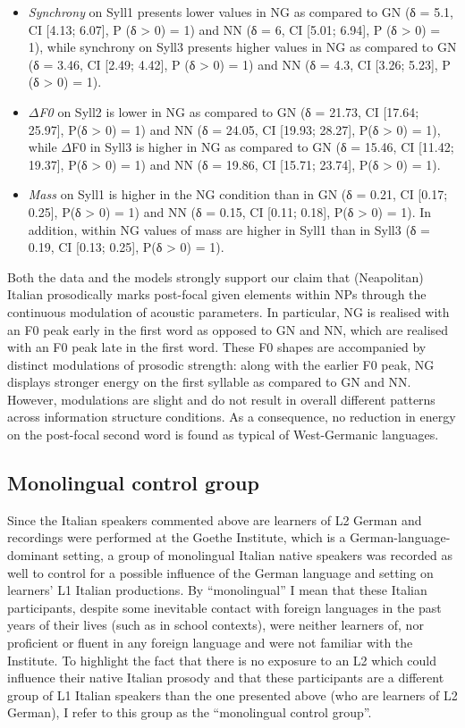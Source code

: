 \begin{itemize}
\item \textit{Synchrony} on Syll1 presents lower values in NG as compared to GN (δ = 5.1, CI [4.13; 6.07], P (δ > 0) = 1) and NN (δ = 6, CI [5.01; 6.94], P (δ > 0) = 1), while synchrony on Syll3 presents higher values in NG as compared to GN (δ = 3.46, CI [2.49; 4.42], P (δ > 0) = 1) and NN (δ = 4.3, CI [3.26; 5.23], P (δ > 0) = 1).
\item \textit{${\Delta}$F0} on Syll2 is lower in NG as compared to GN (δ = 21.73, CI [17.64; 25.97], P(δ > 0) = 1) and NN (δ = 24.05, CI [19.93; 28.27], P(δ > 0) = 1), while ${\Delta}$F0 in Syll3 is higher in NG as compared to GN (δ = 15.46, CI [11.42; 19.37], P(δ > 0) = 1) and NN (δ = 19.86, CI [15.71; 23.74], P(δ > 0) = 1).
\item \textit{Mass} on Syll1 is higher in the NG condition than in GN (δ = 0.21, CI [0.17; 0.25], P(δ > 0) = 1) and NN (δ = 0.15, CI [0.11; 0.18], P(δ > 0) = 1). In addition, within NG values of mass are higher in Syll1 than in Syll3 (δ = 0.19, CI [0.13; 0.25], P(δ > 0) = 1).
\end{itemize}

Both the data and the models strongly support our claim that (Neapolitan) Italian prosodically marks post-focal given elements within NPs through the continuous modulation of acoustic parameters. In particular, NG is realised with an F0 peak early in the first word as opposed to GN and NN, which are realised with an F0 peak late in the first word. These F0 shapes are accompanied by distinct modulations of prosodic strength: along with the earlier F0 peak, NG displays stronger energy on the first syllable as compared to GN and NN. However, modulations are slight and do not result in overall different patterns across information structure conditions. As a consequence, no reduction in energy on the post-focal second word is found as typical of West-Germanic languages. 

\subsection{Monolingual control group}
\label{sec:2.3.2}
Since the Italian speakers commented above are learners of L2 German and recordings were performed at the Goethe Institute, which is a German-language-dominant setting, a group of monolingual Italian native speakers was recorded as well to control for a possible influence of the German language and setting on learners’ L1 Italian productions. By “monolingual” I mean that these Italian participants, despite some inevitable contact with foreign languages in the past years of their lives (such as in school contexts), were neither learners of, nor proficient or fluent in any foreign language and were not familiar with the Institute. To highlight the fact that there is no exposure to an L2 which could influence their native Italian prosody and that these participants are a different group of L1 Italian speakers than the one presented above (who are learners of L2 German), I refer to this group as the “monolingual control group”.

